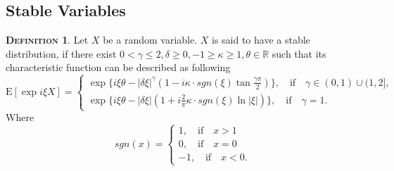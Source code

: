 \documentclass[a4paper, twoside, 11pt]{article}
\theoremstyle{definition}
\newtheorem{definition}{\scshape Definition}[section]
\newtheorem{lemma}[definition]{\scshape Lemma}
\begin{document}
\subsection{Stable Variables}


\begin{definition}
  Let $X$ be a random variable. $X$ is said to have a stable distribution, if there exist $0 < \gamma \le 2, \delta \ge 0, -1 \ge \kappa \ge 1, \theta \in \mathbb{R}$ such that its characteristic function can be described as following
  \begin{equation}
	\mathrm{E} [\exp i\xi X] =  \begin{cases} \exp\{i \xi \theta - |\delta\xi|^\gamma(1-i\kappa\cdot sgn(\xi)\tan \frac{\gamma\pi}{2})\},\hspace{1em}  \text{if}\hspace{1em} \gamma \in (0, 1) \cup (1, 2], \\
	    \exp\{i \xi \theta - |\delta\xi|(1+i\frac{2}{\pi}\kappa\cdot sgn(\xi)\ln |\xi|)\},\hspace{1em} \text{if}\hspace{1em} \gamma = 1.
	  \end{cases}
	\label{sec:stbl}
  \end{equation}
 Where
$$
 sgn(x) = \begin{cases} 1,\hspace{1em} \text{if}\hspace{1em} x > 1\\
   0,\hspace{1em} \text{if}\hspace{1em} x = 0 \\
   -1,\hspace{1em}\text{if}\hspace{1em} x < 0.
 \end{cases}
  $$
\end{definition}
\end{document}
